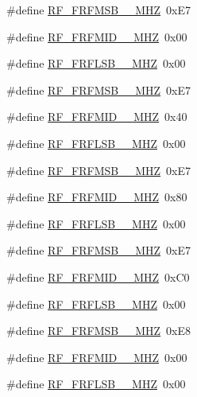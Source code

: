 \begin{DoxyCompactItemize}
\item 
\#define \hyperlink{sx1276Regs-Fsk_8h_ad8aba952c014e2c08340d73f404f3072}{R\+F\+\_\+\+F\+R\+F\+M\+S\+B\+\_\+\_\+\+M\+HZ}~0x\+E7
\item 
\#define \hyperlink{sx1276Regs-Fsk_8h_ad9f0fa1a4f699e3fa4e6095c50423f20}{R\+F\+\_\+\+F\+R\+F\+M\+I\+D\+\_\+\_\+\+M\+HZ}~0x00
\item 
\#define \hyperlink{sx1276Regs-Fsk_8h_a0121ab508575ecf2f3af83b4affe913d}{R\+F\+\_\+\+F\+R\+F\+L\+S\+B\+\_\+\_\+\+M\+HZ}~0x00
\item 
\#define \hyperlink{sx1276Regs-Fsk_8h_a9317e75c46b2888c847f5d5560fc4295}{R\+F\+\_\+\+F\+R\+F\+M\+S\+B\+\_\+\_\+\+M\+HZ}~0x\+E7
\item 
\#define \hyperlink{sx1276Regs-Fsk_8h_ad764821102179c03fa856b0068bce2c1}{R\+F\+\_\+\+F\+R\+F\+M\+I\+D\+\_\+\_\+\+M\+HZ}~0x40
\item 
\#define \hyperlink{sx1276Regs-Fsk_8h_ac2d3a6fb3a8d88975487b7c811bbd99c}{R\+F\+\_\+\+F\+R\+F\+L\+S\+B\+\_\+\_\+\+M\+HZ}~0x00
\item 
\#define \hyperlink{sx1276Regs-Fsk_8h_a65a33036761574a1a055363a12432579}{R\+F\+\_\+\+F\+R\+F\+M\+S\+B\+\_\+\_\+\+M\+HZ}~0x\+E7
\item 
\#define \hyperlink{sx1276Regs-Fsk_8h_a1b35ddffb5369efd6a34ded63724ceab}{R\+F\+\_\+\+F\+R\+F\+M\+I\+D\+\_\+\_\+\+M\+HZ}~0x80
\item 
\#define \hyperlink{sx1276Regs-Fsk_8h_ac664acd9a4e7749794f8a533a05436a1}{R\+F\+\_\+\+F\+R\+F\+L\+S\+B\+\_\+\_\+\+M\+HZ}~0x00
\item 
\#define \hyperlink{sx1276Regs-Fsk_8h_a038d10c481806a8f4f5165d91019ce50}{R\+F\+\_\+\+F\+R\+F\+M\+S\+B\+\_\+\_\+\+M\+HZ}~0x\+E7
\item 
\#define \hyperlink{sx1276Regs-Fsk_8h_a5f486d2c3784ae62187f57030d347b17}{R\+F\+\_\+\+F\+R\+F\+M\+I\+D\+\_\+\_\+\+M\+HZ}~0x\+C0
\item 
\#define \hyperlink{sx1276Regs-Fsk_8h_aafaad9f6003901f9081b92d207c67022}{R\+F\+\_\+\+F\+R\+F\+L\+S\+B\+\_\+\_\+\+M\+HZ}~0x00
\item 
\#define \hyperlink{sx1276Regs-Fsk_8h_a61fa44af0eda546fb2dd7a2d1e772e9f}{R\+F\+\_\+\+F\+R\+F\+M\+S\+B\+\_\+\_\+\+M\+HZ}~0x\+E8
\item 
\#define \hyperlink{sx1276Regs-Fsk_8h_a0fe5c603e40a6d7c28902efeefc14049}{R\+F\+\_\+\+F\+R\+F\+M\+I\+D\+\_\+\_\+\+M\+HZ}~0x00
\item 
\#define \hyperlink{sx1276Regs-Fsk_8h_abedb5dbcb3f48722c93379c37eb7cdee}{R\+F\+\_\+\+F\+R\+F\+L\+S\+B\+\_\+\_\+\+M\+HZ}~0x00

\end{DoxyCompactItemize}
